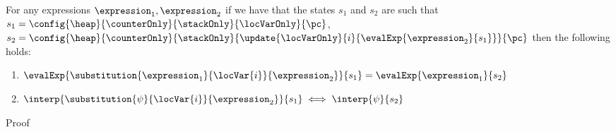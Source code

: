 \begin{substLv}\label{substLv}
For any expressions $ \expression_1, \expression_2 $ 
if we have that the states $s_1$ and $s_2$ are such that
$ s_1 =   \config{\heap}{\counterOnly}{ \stackOnly }{\locVarOnly}{\pc }$, %
$ s_2 =   \config{\heap}{\counterOnly }{ \stackOnly }{\update{\locVarOnly}{i}{ \evalExp{ \expression_2}{ s_1 } }}{\pc }  $
 then 
the following holds:
\begin{enumerate}
      \item $\evalExp{\substitution{\expression_1}{ \locVar{i} }{ \expression_2 }}{ s_1 } = \evalExp{\expression_1}{s_2} $
      \item $\interp{\substitution{\psi}{ \locVar{i} }{ \expression_2 }}{ s_1 } \iff \interp{\psi}{s_2} $
\end{enumerate}
\end{substLv}
Proof 
